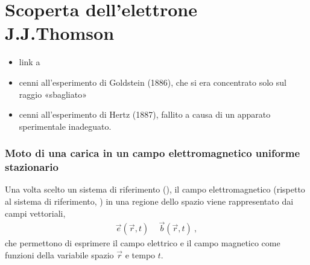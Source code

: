 \documentclass[letterpaper,10pt,italian]{jupyterBook}
\begin{document}
\section{Scoperta dell’elettrone \sphinxhyphen{} J.J.Thomson}
\label{\detokenize{ch/modern/experiments:scoperta-dell-elettrone-j-j-thomson}}\label{\detokenize{ch/modern/experiments:modern-experiments-thomson-electron}}
\sphinxAtStartPar
{}
\begin{itemize}
\item {} 
\sphinxAtStartPar
link a {\hyperref[\detokenize{ch/electromagnetism/electric-current:physics-hs-electromagnetism-electric-current-gas}]{}}

\item {} 
\sphinxAtStartPar
cenni all’esperimento di Goldstein (1886), che si era concentrato solo sul raggio «sbagliato»

\item {} 
\sphinxAtStartPar
cenni all’esperimento di Hertz (1887), fallito a causa di un apparato sperimentale inadeguato.  

\end{itemize}
\subsubsection*{Moto di una carica in un campo elettromagnetico uniforme stazionario}

\sphinxAtStartPar
Una volta scelto un sistema di riferimento (), il campo elettromagnetico (rispetto al sistema di riferimento,  ) in una regione dello spazio viene rappresentato dai campi vettoriali,
\begin{equation*}
\begin{split}\vec{e}(\vec{r},t) \, \quad \vec{b}(\vec{r},t) \ ,\end{split}
\end{equation*}
\sphinxAtStartPar
che permettono di esprimere il campo elettrico e il campo magnetico come funzioni della variabile spazio \(\vec{r}\) e tempo \(t\).
\end{document}
